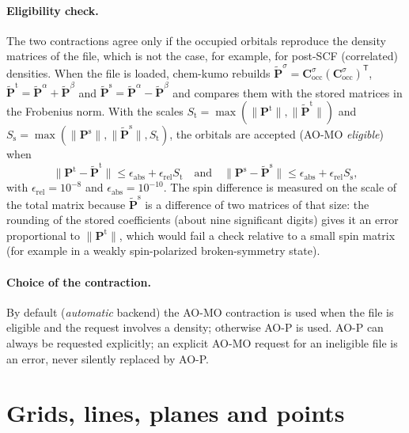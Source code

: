 \documentclass[11pt,a4paper]{article}
\begin{document}
\paragraph{Eligibility check.} The two contractions agree only if the
occupied orbitals reproduce the density matrices of the file, which is not
the case, for example, for post-SCF (correlated) densities. When the file is
loaded, chem-kumo rebuilds
$\tilde{\mathbf P}^\sigma=\mathbf C^\sigma_{\mathrm{occ}}(\mathbf C^\sigma_{\mathrm{occ}})^{\mathsf T}$,
$\tilde{\mathbf P}^{\mathrm t}=\tilde{\mathbf P}^\alpha+\tilde{\mathbf P}^\beta$ and
$\tilde{\mathbf P}^{\mathrm s}=\tilde{\mathbf P}^\alpha-\tilde{\mathbf P}^\beta$
and compares them with the stored matrices in the Frobenius norm. With the
scales
$S_{\mathrm t}=\max(\|\mathbf P^{\mathrm t}\|,\|\tilde{\mathbf P}^{\mathrm t}\|)$ and
$S_{\mathrm s}=\max(\|\mathbf P^{\mathrm s}\|,\|\tilde{\mathbf P}^{\mathrm s}\|,S_{\mathrm t})$,
the orbitals are accepted (AO-MO \emph{eligible}) when
\begin{equation}
 \|\mathbf P^{\mathrm t}-\tilde{\mathbf P}^{\mathrm t}\|\le
 \epsilon_{\mathrm{abs}}+\epsilon_{\mathrm{rel}}S_{\mathrm t}
 \quad\text{and}\quad
 \|\mathbf P^{\mathrm s}-\tilde{\mathbf P}^{\mathrm s}\|\le
 \epsilon_{\mathrm{abs}}+\epsilon_{\mathrm{rel}}S_{\mathrm s},
\end{equation}
with $\epsilon_{\mathrm{rel}}=10^{-8}$ and $\epsilon_{\mathrm{abs}}=10^{-10}$.
The spin difference is measured on the scale of the total matrix because
$\tilde{\mathbf P}^{\mathrm s}$ is a difference of two matrices of that
size: the rounding of the stored coefficients (about nine significant
digits) gives it an error proportional to $\|\mathbf P^{\mathrm t}\|$, which
would fail a check relative to a small spin matrix (for example in a weakly
spin-polarized broken-symmetry state).

\paragraph{Choice of the contraction.} By default (\emph{automatic}
backend) the AO-MO contraction is used when the file is eligible and the
request involves a density; otherwise AO-P is used. AO-P can always be
requested explicitly; an explicit AO-MO request for an ineligible file is
an error, never silently replaced by AO-P.

\section{Grids, lines, planes and points}\label{sec:grids}
\end{document}

